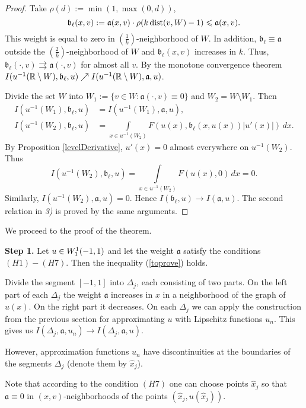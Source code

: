 \begin{proof}
Take $\rho(d) := \min(1, \max(0, d))$,
$$\mathfrak b_{\ell}(x, v) := \mathfrak a(x, v) \cdot \rho(k \mathop{\rm dist}\nolimits(v, W) - 1) \leqslant \mathfrak a(x, v).$$
This weight is equal to zero in $\left(\frac{1}{k}\right)$-neighborhood of $W$.
In addition, $\mathfrak b_{\ell} \equiv \mathfrak a$ outside the $\left(\frac{2}{k}\right)$-neighborhood of $W$ and
$\mathfrak b_{\ell}(x, v)$ increases in $k$.
Thus, $\mathfrak b_{\ell}(\cdot, v) \rightrightarrows \mathfrak a(\cdot, v)$ for almost all $v$.
By the monotone convergence theorem
$I(u^{-1}(\mathbb R \setminus W), \mathfrak b_{\ell}, u) \nearrow I(u^{-1}(\mathbb R \setminus W), \mathfrak a, u)$.

Divide the set $W$ into $W_1 := \{v \in W: \mathfrak a(\cdot, v) \equiv 0\}$ and $W_2 = W \setminus W_1$.
Then
$$
\begin{aligned}
I(u^{-1}(W_1), \mathfrak b_{\ell}, u) &= I(u^{-1}(W_1), \mathfrak a, u),\\
I(u^{-1}(W_2), \mathfrak b_{\ell}, u) &= \int\limits_{x \in u^{-1}(W_2)} F(u(x), \mathfrak b_{\ell}(x, u(x)) |u'(x)|) \, dx.
\end{aligned}
$$
By Proposition \ref{levelDerivative}, $u'(x) = 0$ almost everywhere on $u^{-1}(W_2)$.
Thus
$$I(u^{-1}(W_2), \mathfrak b_{\ell}, u) = \int\limits_{x \in u^{-1}(W_2)} F(u(x), 0) \, dx = 0.$$
Similarly, $I(u^{-1}(W_2), \mathfrak a, u) = 0$. Hence $I(\mathfrak b_{\ell}, u) \to I(\mathfrak a, u)$.
The second relation in {\it 3)} is proved by the same arguments.
\end{proof}

We proceed to the proof of the theorem.

\bigskip
{\bf Step 1.} Let $u \in W_1^1(-1, 1)$ and let the weight $\mathfrak a$ satisfy the conditions $(H1)-(H7)$.
Then the inequality (\ref{toprove}) holds.

Divide the segment $[-1, 1]$ into $\Delta_j$, each consisting of two parts.
On the left part of each $\Delta_j$ the weight $\mathfrak a$ increases in $x$ in a neighborhood
of the graph of $u(x)$. On the right part it decreases.
On each $\Delta_j$ we can apply the construction from the previous section
for approximating $u$ with Lipschitz functions $u_n$.
This gives us $I(\Delta_j, \mathfrak a, u_n) \to I(\Delta_j, \mathfrak a, u)$.

However, approximation functions $u_n$ have discontinuities at the boundaries of the segments $\Delta_j$
(denote them by $\hat{x}_j$).

Note that according to the condition $(H7)$ one can choose points $\hat{x}_j$ so
that $\mathfrak a \equiv 0$ in $(x, v)$-neighborhoods of the points $(\hat{x}_j, u(\hat{x}_j))$.

